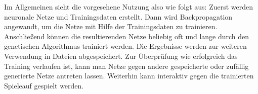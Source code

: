 Im Allgemeinen sieht die vorgesehene Nutzung also wie folgt aus: Zuerst werden
neuronale Netze und Trainingsdaten erstellt.  Dann wird Backpropagation
angewandt, um die Netze mit Hilfe der Trainingsdaten zu trainieren.
Anschließend können die resultierenden Netze beliebig oft und lange durch den
genetischen Algorithmus trainiert werden. Die Ergebnisse werden zur weiteren
Verwendung in Dateien abgespeichert.
Zur Überprüfung wie erfolgreich das Training verlaufen ist, kann man Netze
gegen andere gespeicherte oder zufällig generierte Netze antreten lassen.
Weiterhin kann interaktiv gegen die trainierten Spieleauf gespielt werden.
